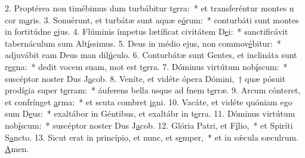 2. Proptérea non timébimus dum turbábitur t\uline{e}rra:~* et transferéntur montes n cor m\uline{a}ris.
3. Sonuérunt, et turbátæ sunt aquæ e\uline{ó}rum:~* conturbáti sunt montes in fortitúdne \uline{e}jus.
4. Flúminis ímpetus lætíficat civitátem D\uline{e}i:~* sanctificávit tabernáculum sum Alt\uline{í}ssimus.
5. Deus in médio ejus, non commov\uline{é}bitur:~* adjuvábit eam Deus man dil\uline{ú}culo.
6. Conturbátæ sunt Gentes, et inclináta sunt r\uline{e}gna:~* dedit vocem suam, mot est t\uline{e}rra.
7. Dóminus virtútum nob\uline{í}scum:~* suscéptor noster Dus J\uline{a}cob.
8. Veníte, et vidéte ópera Dómini,~† quæ pósuit prodígia super t\uline{e}rram:~* áuferens bella usque ad fnem t\uline{e}rræ.
9. Arcum cónteret, et confrínget \uline{a}rma:~* et scuta combret \uline{i}gni.
10. Vacáte, et vidéte quóniam ego sum D\uline{e}us:~* exaltábor in Géntibus, et exaltábr in t\uline{e}rra.
11. Dóminus virtútum nob\uline{í}scum:~* suscéptor noster Dus J\uline{a}cob.
12. Glória Patri, et F\uline{í}lio,~* et Spiríti S\uline{a}ncto.
13. Sicut erat in princípio, et nunc, et s\uline{e}mper,~* et in sǽcula sæculrum. \uline{A}men.
